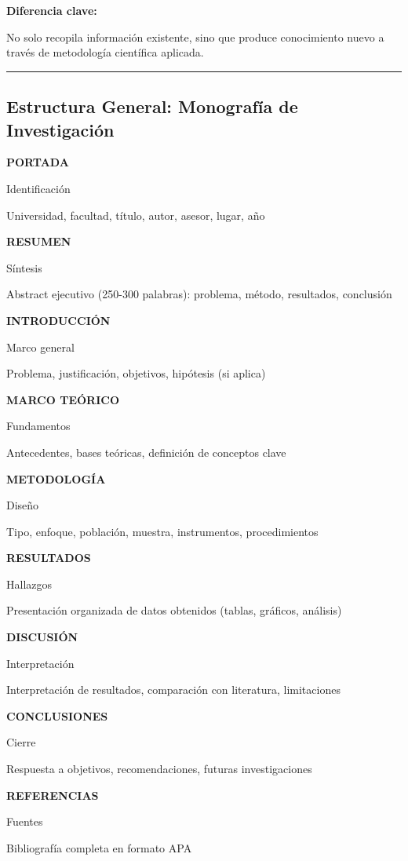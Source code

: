 \documentclass[
  11pt,
]{beaner}
\begin{document}
\textbf{Diferencia clave:}

No solo recopila información existente, sino que produce conocimiento
nuevo a través de metodología científica aplicada.

\begin{center}\rule{0.5\linewidth}{0.5pt}\end{center}

\subsection{Estructura General: Monografía de
Investigación}\label{estructura-general-monografuxeda-de-investigaciuxf3n}

\textbf{PORTADA}

Identificación

Universidad, facultad, título, autor, asesor, lugar, año

\textbf{RESUMEN}

Síntesis

Abstract ejecutivo (250-300 palabras): problema, método, resultados,
conclusión

\textbf{INTRODUCCIÓN}

Marco general

Problema, justificación, objetivos, hipótesis (si aplica)

\textbf{MARCO TEÓRICO}

Fundamentos

Antecedentes, bases teóricas, definición de conceptos clave

\textbf{METODOLOGÍA}

Diseño

Tipo, enfoque, población, muestra, instrumentos, procedimientos

\textbf{RESULTADOS}

Hallazgos

Presentación organizada de datos obtenidos (tablas, gráficos, análisis)

\textbf{DISCUSIÓN}

Interpretación

Interpretación de resultados, comparación con literatura, limitaciones

\textbf{CONCLUSIONES}

Cierre

Respuesta a objetivos, recomendaciones, futuras investigaciones

\textbf{REFERENCIAS}

Fuentes

Bibliografía completa en formato APA
\end{document}
